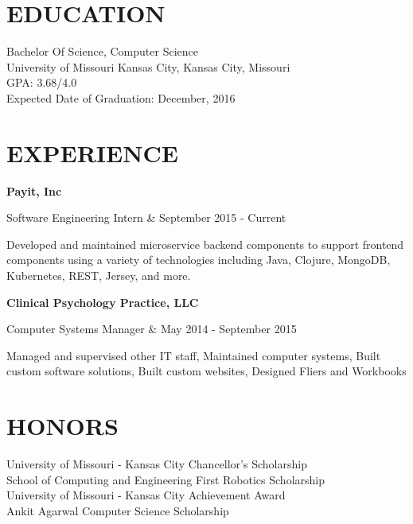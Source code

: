 \documentclass[margin,10pt]{res} %
\begin{document}

\address{ 5534 Lydia Avenue \\ Kansas City, Missouri 64112 \\
(913) 908-6148 \\ cdrm4@mail.umkc.edu \\ http://octopuscabbage.github.io \\}

\begin{resume}
 
\section{EDUCATION}       
 Bachelor Of Science, Computer Science  \\
                University of Missouri Kansas City, Kansas City, Missouri \\ 
                GPA: 3.68/4.0 \\
                Expected Date of Graduation: December, 2016
 
 
\section{EXPERIENCE}      

		{\bf Payit, Inc} \\
			\begin{ncolumn}{2}
			Software Engineering Intern & September 2015 - Current
			\end{ncolumn}
			Developed and maintained microservice backend components to support frontend components using a variety of technologies including Java, Clojure, MongoDB, Kubernetes, REST, Jersey, and more.
			
		{\bf Clinical Psychology Practice, LLC} \\
			\begin{ncolumn}{2}
			Computer Systems Manager & May 2014 - September 2015
			\end{ncolumn}
			Managed and supervised other IT staff, Maintained computer systems, Built custom software solutions, Built custom websites, Designed Fliers and Workbooks
		
 
 
\section{HONORS}
University of Missouri - Kansas City Chancellor's Scholarship \\
School of Computing and Engineering First Robotics Scholarship \\ 
University of Missouri - Kansas City Achievement Award  \\
Ankit Agarwal Computer Science Scholarship


\end{resume}
\end{document}
